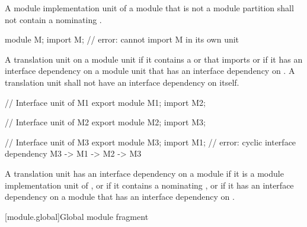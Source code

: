 \begin{std.txt}
  \pnum
  A module implementation unit of a module 
  that is not a module partition
  shall not contain a 
  nominating .
  \begin{example}
  \begin{codeblock}
     module M;
     import M;          // error: cannot import M in its own unit
  \end{codeblock} 
  \end{example}

\color{addclr}
  \pnum
  A translation unit  on a module unit 
  if it contains a  or
   that imports  or if it has
  an interface dependency on a module unit that has an interface dependency on .
  A translation unit shall not have an interface dependency on itself.
  \begin{example}
  \begin{Program}
     // Interface unit of M1
     export module M1;
     import M2;

     // Interface unit of M2
     export module M2;
     import M3;

     // Interface unit of M3
     export module M3;
     import M1;         // error: cyclic interface dependency M3 -> M1 -> M2 -> M3
  \end{Program}
  \end{example}

\begin{before}\color{addclr}
\pnum
  A translation unit has an interface dependency on a module  if it is
  a module implementation unit of , or if it contains a
   nominating , or if it has
  an interface dependency on a module that has an interface dependency on .
\end{before}
\end{std.txt}

[module.global]{Global module fragment}

